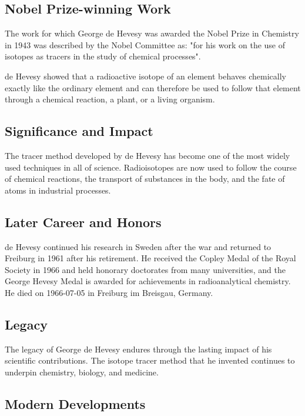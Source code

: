 \subsection*{Nobel Prize-winning Work}

The work for which George de Hevesy was awarded the Nobel Prize in Chemistry in 1943 was described by the Nobel Committee as: "for his work on the use of isotopes as tracers in the study of chemical processes".

de Hevesy showed that a radioactive isotope of an element behaves chemically exactly like the ordinary element and can therefore be used to follow that element through a chemical reaction, a plant, or a living organism.

\subsection*{Significance and Impact}

The tracer method developed by de Hevesy has become one of the most widely used techniques in all of science.
Radioisotopes are now used to follow the course of chemical reactions, the transport of substances in the body, and the fate of atoms in industrial processes.

\subsection*{Later Career and Honors}

de Hevesy continued his research in Sweden after the war and returned to Freiburg in 1961 after his retirement.
He received the Copley Medal of the Royal Society in 1966 and held honorary doctorates from many universities, and the George Hevesy Medal is awarded for achievements in radioanalytical chemistry.
He died on 1966-07-05 in Freiburg im Breisgau, Germany.

\subsection*{Legacy}

The legacy of George de Hevesy endures through the lasting impact of his scientific contributions.
The isotope tracer method that he invented continues to underpin chemistry, biology, and medicine.

\subsection*{Modern Developments}

